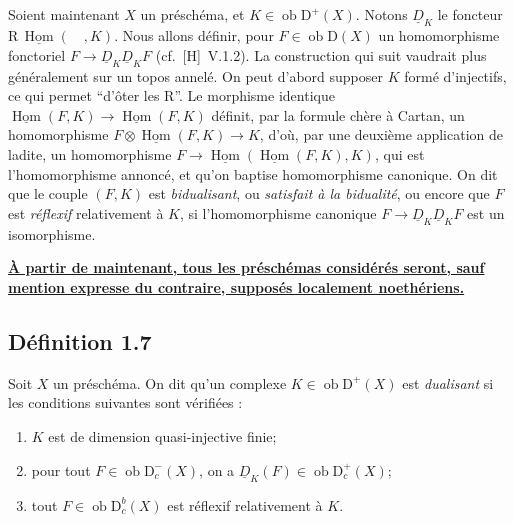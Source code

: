 \documentclass[11pt]{article}
\DeclareMathOperator{\Hom}{Hom}
\newcommand{\R}{\mathrm{R}}
\newcommand{\D}{\mathrm{D}}
\newcommand{\ob}{\operatorname{ob}}
\providecommand{\Hom}{\operatorname{Hom}}
\providecommand{\ob}{\operatorname{ob}}
\providecommand{\R}{\mathrm R}
\providecommand{\Hom}{\operatorname{Hom}}
\begin{document}
Soient maintenant $X$ un préschéma, et $K \in \ob \D^{+}(X)$. Notons $\underline{D}_K$ le foncteur $\R\,\underline{\Hom}(\quad, K)$. Nous allons définir, pour $F \in \ob \D(X)$ un homomorphisme fonctoriel $F \to \underline{D}_K \underline{D}_K F$ (cf.~[H]~V.1.2). La construction qui suit vaudrait plus généralement sur un topos annelé. On peut d'abord supposer $K$ formé d'injectifs, ce qui permet ``d'ôter les $\R$''. Le morphisme identique $\underline{\Hom}(F,K) \to \underline{\Hom}(F,K)$ définit, par la formule chère à Cartan, un homomorphisme $F \otimes \underline{\Hom}(F,K) \to K$, d'où, par une deuxième application de ladite, un homomorphisme $F \to \underline{\Hom}(\underline{\Hom}(F,K), K)$, qui est l'homomorphisme annoncé, et qu'on baptise homomorphisme canonique. On dit que le couple $(F,K)$ est \emph{bidualisant}, ou \emph{satisfait à la bidualité}, ou encore que $F$ est \emph{réflexif} relativement à $K$, si l'homomorphisme canonique $F \to \underline{D}_K \underline{D}_K F$ est un isomorphisme.

\textbf{\underline{À partir de maintenant, tous les préschémas considérés seront, sauf mention expresse du contraire, supposés localement noethériens.}}

\subsection*{Définition 1.7}
Soit $X$ un préschéma. On dit qu'un complexe $K \in \ob \D^{+}(X)$ est \emph{dualisant} si les conditions suivantes sont vérifiées :
\begin{enumerate}[label=(\roman*)]
\item $K$ est de dimension quasi-injective finie;
\item pour tout $F \in \ob \D_c^{-}(X)$, on a $\underline{D}_K(F) \in \ob \D_c^{+}(X)$;
\item tout $F \in \ob \D_c^{b}(X)$ est réflexif relativement à $K$.
\end{enumerate}
\end{document}
